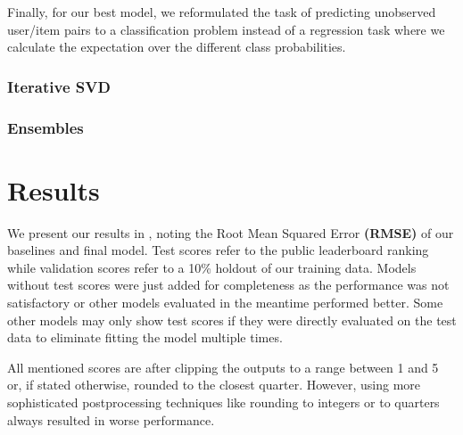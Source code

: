 \documentclass[10pt,conference,compsocconf]{IEEEtran}
\begin{document}
    Finally, for our best model, we reformulated the task of predicting unobserved user/item pairs to a classification problem instead of a regression task where we calculate the expectation over the different class probabilities.

    \subsubsection{Iterative SVD}

    \subsubsection{Ensembles}


    \section{Results}
    We present our results in , noting the Root Mean Squared Error \textbf{(RMSE)} of our baselines and final model.
    Test scores refer to the public leaderboard ranking while validation scores refer to a 10\% holdout of our training data.
    Models without test scores were just added for completeness as the performance was not satisfactory or other models evaluated in the meantime performed better.
    Some other models may only show test scores if they were directly evaluated on the test data to eliminate
    fitting the model multiple times.

    All mentioned scores are after clipping the outputs to a range between 1 and 5 or, if stated otherwise, rounded to the closest quarter.
    However, using more sophisticated postprocessing techniques like rounding to integers or to quarters always resulted in worse performance.
\end{document}

